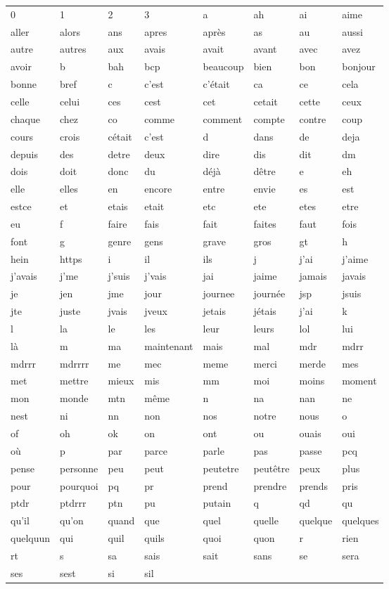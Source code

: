 \begin{tabular}{llllllll}
0&1&2&3&a&ah&ai&aime\\aller&alors&ans&apres&après&as&au&aussi\\autre&autres&aux&avais&avait&avant&
avec&avez\\avoir&b&bah&bcp&beaucoup&bien&bon&bonjour\\bonne&bref&c&c'est&c'était&ca&ce&cela\\celle&
celui&ces&cest&cet&cetait&cette&ceux\\chaque&chez&co&comme&comment&compte&contre&coup\\cours&crois&
cétait&c’est&d&dans&de&deja\\depuis&des&detre&deux&dire&dis&dit&dm\\dois&doit&donc&du&déjà&dêtre&e&
eh\\elle&elles&en&encore&entre&envie&es&est\\estce&et&etais&etait&etc&ete&etes&etre\\eu&f&faire&fais&
fait&faites&faut&fois\\font&g&genre&gens&grave&gros&gt&h\\hein&https&i&il&ils&j&j'ai&j'aime\\j'avais&
j'me&j'suis&j'vais&jai&jaime&jamais&javais\\je&jen&jme&jour&journee&journée&jsp&jsuis\\jte&juste&jvais&
jveux&jetais&jétais&j’ai&k\\l&la&le&les&leur&leurs&lol&lui\\là&m&ma&maintenant&mais&mal&mdr&mdrr\\
mdrrr&mdrrrr&me&mec&meme&merci&merde&mes\\met&mettre&mieux&mis&mm&moi&moins&moment\\mon&monde&mtn&
même&n&na&nan&ne\\nest&ni&nn&non&nos&notre&nous&o\\of&oh&ok&on&ont&ou&ouais&oui\\où&p&par&parce&
parle&pas&passe&pcq\\pense&personne&peu&peut&peutetre&peutêtre&peux&plus\\pour&pourquoi&pq&pr&prend&
prendre&prends&pris\\ptdr&ptdrrr&ptn&pu&putain&q&qd&qu\\qu'il&qu'on&quand&que&quel&quelle&quelque&
quelques\\quelquun&qui&quil&quils&quoi&quon&r&rien\\rt&s&sa&sais&sait&sans&se&sera\\ses&sest&si&sil&

\end{tabular}
